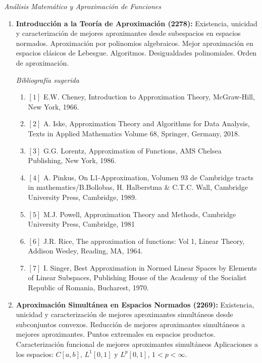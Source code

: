 \documentclass[10pt,a4paper]{article}
\begin{document}
\begin{center}
 \emph{Análisis Matemático y Aproximación de Funciones}
\end{center}

\begin{enumerate}

\item\textbf{Introducción a la Teoría de Aproximación (2278):}
Existencia, unicidad y caracterización de mejores aproximantes desde subespacios en espacios normados. Aproximación por polinomios algebraicos.  Mejor aproximación en espacios clásicos de Lebesgue. Algoritmos. Desigualdades polinomiales. Orden de aproximación. 

\noindent \textit{Bibliografía sugerida}

\begin{enumerate}[]
\item	$[1]$ E.W. Cheney, Introduction to Approximation Theory, McGraw-Hill, New York, 1966. 
\item $[2]$ A. Iske, Approximation Theory and Algorithms for Data Analysis, Texts in Applied Mathematics Volume 68, Springer, Germany, 2018.
\item	$[3]$ G.G. Lorentz, Approximation of Functions, AMS Chelsea Publishing, New York, 1986. 
\item	$[4]$ A. Pinkus, On L1-Approximation, Volumen 93 de Cambridge tracts in mathematics/B.Bollobas, H. Halberstma \& C.T.C. Wall, Cambridge University Press, Cambridge, 1989.
\item	$[5]$ M.J. Powell, Approximation Theory and Methods, Cambridge University Press, Cambridge, 1981
\item	$[6]$ J.R. Rice, The approximation of functions: Vol 1, Linear Theory, Addison Wesley,  Reading, MA, 1964. 
\item	$[7]$ I. Singer, Best Approximation in Normed Linear Spaces by Elements of Linear Subspaces, Publishing House of the Academy of the Socialist Republic of Romania, Bucharest, 1970.
\end{enumerate}

\item\textbf{ Aproximación Simultánea en Espacios Normados (2269):} Existencia,  unicidad y caracterización de mejores aproximantes simultáneos desde subconjuntos
convexos.  Reducción  de  mejores aproximantes simultáneos a mejores aproximantes.   Puntos  extremales  en  espacios  productos. Caracterización  funcional de  mejores aproximantes  simultáneos  Aplicaciones  a  los espacios: $C[a,b]$, $L^1[0,1]$ y $L^p[0,1]$, $1 < p <\infty$.


\end{enumerate}
\end{document}
